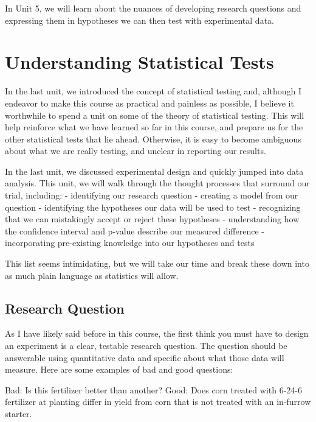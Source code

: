 \documentclass[
]{book}
\begin{document}
In Unit 5, we will learn about the nuances of developing research
questions and expressing them in hypotheses we can then test with
experimental data.

\hypertarget{understanding-statistical-tests}{%
\chapter{Understanding Statistical Tests}\label{understanding-statistical-tests}}

In the last unit, we introduced the concept of statistical testing and, although I endeavor to make this course as practical and painless as possible, I believe it worthwhile to spend a unit on some of the theory of statistical testing. This will help reinforce what we have learned so far in this course, and prepare us for the other statistical tests that lie ahead. Otherwise, it is easy to become ambiguous about what we are really testing, and unclear in reporting our results.

In the last unit, we discussed experimental design and quickly jumped into data analysis. This unit, we will walk through the thought processes that surround our trial, including:
- identifying our research question
- creating a model from our question
- identifying the hypotheses our data will be used to test
- recognizing that we can mistakingly accept or reject these hypotheses
- understanding how the confidence interval and p-value describe our measured difference
- incorporating pre-existing knowledge into our hypotheses and tests

This list seems intimidating, but we will take our time and break these down into as much plain language as statistics will allow.

\hypertarget{research-question}{%
\section{Research Question}\label{research-question}}

As I have likely said before in this course, the first think you must have to design an experiment is a clear, testable research question. The question should be answerable using quantitative data and specific about what those data will measure. Here are some examples of bad and good questions:

Bad: Is this fertilizer better than another?
Good: Does corn treated with 6-24-6 fertilizer at planting differ in yield from corn that is not treated with an in-furrow starter.
\end{document}
